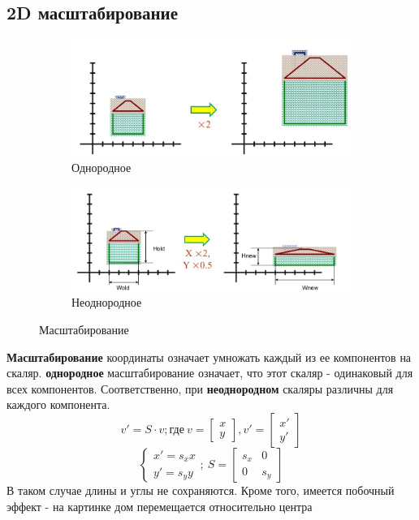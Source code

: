\documentclass[a4paper, 14pt]{extarticle}
\begin{document}
\subsection{2D масштабирование}
\begin{figure}[h]
	\centering
	\begin{subfigure}[b]{0.4\textwidth}
		\centering
		\includegraphics[width=\textwidth]{l3/S006.jpg}
		\caption{Однородное}
	\end{subfigure}
	\begin{subfigure}[b]{0.4\textwidth}
		\centering
		\includegraphics[width=\textwidth]{l3/S007.jpg}
		\caption{Неоднородное}
	\end{subfigure}
	\caption{Масштабирование}
\end{figure}
\textbf{Масштабирование} координаты означает умножать каждый из ее компонентов на скаляр. \textbf{однородное} масштабирование означает, что этот скаляр - одинаковый для всех компонентов. Соответственно, при \textbf{неоднородном} скаляры различны для каждого компонента.
$$
v' = S \cdot v; \textrm{где} \ v=\begin{bmatrix} x \\ y \end{bmatrix}, v'=\begin{bmatrix} x' \\ y' \end{bmatrix}
$$
$$
\begin{cases}
	x'=s_x x\\
	y'=s_y y
\end{cases}; \
S = \begin{bmatrix}
	s_x & 0 \\
	0 & s_y
\end{bmatrix}
$$
В таком случае длины и углы не сохраняются. Кроме того, имеется побочный эффект - на картинке дом перемещается относительно центра
\end{document}
